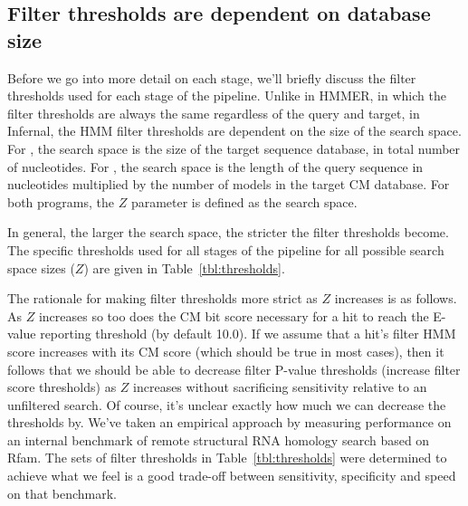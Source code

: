 \subsection{Filter thresholds are dependent on database size}
Before we go into more detail on each stage, we'll briefly discuss the
filter thresholds used for each stage of the pipeline. Unlike in
HMMER, in which the filter thresholds are always the same regardless
of the query and target, in Infernal, the HMM filter thresholds are
dependent on the size of the search space. For , the
search space is the size of the target sequence database, in total
number of nucleotides. For , the search space is the
length of the query sequence in nucleotides multiplied by the number
of models in the target CM database. For both programs, the $Z$
parameter is defined as the search space.

In general, the larger the search space, the stricter the filter
thresholds become. The specific thresholds used for all stages of the
pipeline for all possible search space sizes ($Z$) are given in
Table~\ref{tbl:thresholds}.

The rationale for making filter thresholds more strict as $Z$
increases is as follows. As $Z$ increases so too does the CM bit
score necessary for a hit to reach the E-value reporting threshold (by
default 10.0). If we assume that a hit's filter HMM score
increases with its CM score (which should be true in most cases), then
it follows that we should be able to decrease filter P-value
thresholds (increase filter score thresholds) as $Z$ increases without
sacrificing sensitivity relative to an unfiltered search. Of course,
it's unclear exactly how much we can decrease the thresholds by. We've
taken an empirical approach by measuring performance on an internal
benchmark of remote structural RNA homology search based on Rfam. The
sets of filter thresholds in Table~\ref{tbl:thresholds} were
determined to achieve what we feel is a good trade-off between
sensitivity, specificity and speed on that benchmark.

